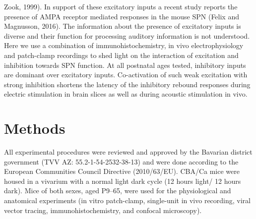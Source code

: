 \documentclass{article}
\begin{document}
Zook, 1999). In support of these excitatory inputs a recent study reports the presence of AMPA receptor mediated responses in the mouse SPN (Felix and Magnusson, 2016).  The information about the presence of excitatory inputs is diverse and their function for processing auditory information is not understood. Here we use a combination of immunohistochemistry, in vivo electrophysiology and patch-clamp recordings to shed light on the interaction of excitation and inhibition towards SPN function. At all postnatal ages tested, inhibitory inputs are dominant over excitatory inputs. Co-activation of such weak excitation with strong inhibition shortens the latency of the inhibitory rebound responses during electric stimulation in brain slices as well as during acoustic stimulation in vivo.

\section{Methods}
All experimental procedures were reviewed and approved by the Bavarian district government (TVV AZ: 55.2-1-54-2532-38-13) and were done according to the European Communities Council Directive (2010/63/EU). CBA/Ca mice were housed in a vivarium with a normal light dark cycle (12 hours light/ 12 hours dark). Mice of both sexes, aged P9–65, were used for the physiological and anatomical experiments (in vitro patch-clamp, single-unit in vivo recording, viral vector tracing, immunohistochemistry, and confocal microscopy).
\end{document}
